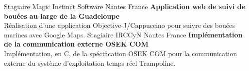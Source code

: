 \documentclass[10pt, a4paper]{moderncv}
\begin{document}
            {Stagiaire}
            {Magic Instinct Software}
            {Nantes}
            {France}
            {\textbf{Application web de suivi de bouées au large de la
             Guadeloupe}\\
             Réalisation d'une application Objective-J/Cappuccino pour suivre
             des bouées marines avec Google Maps.}
            {Stagiaire}
            {IRCCyN}
            {Nantes}
            {France}
            {\textbf{Implémentation de la communication externe OSEK COM}\\
             Implémentation, en C, de la spécification OSEK COM pour la
             communication externe du système d'exploitation temps réel
             Trampoline.}

  
  
  \nocite{*}
\end{document}
